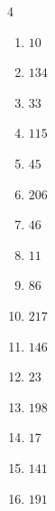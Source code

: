 \begin{multicols}{4}
\begin{enumerate}
  \item $10$


\columnbreak %

  \item $134$


  \item $33$


  \item $115$


  \item $45$


  \item $206$


  \item $46$


  \item $11$


  \item $86$


  \item $217$


  \item $146$


  \item $23$


  \item $198$


  \item $17$


  \item $141$


  \item $191$


\end{enumerate}
\end{multicols}
